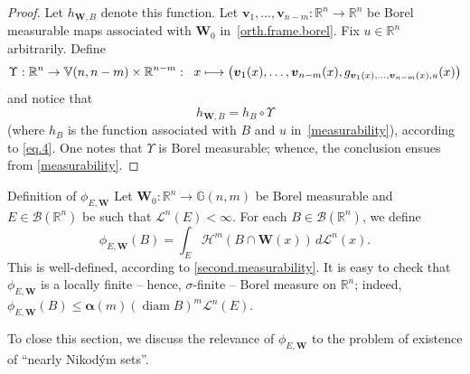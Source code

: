 \documentclass[JEP,XML,SOM,Unicode,ThmDefs,NoEqCountersInSection]{cedram}
\newcommand\mto{\mathchoice{\longmapsto}{\mapsto}{\mapsto}{\mapsto}}
\newenvironment{Empty}[2][\null]{%
\begin{enonce}[remark]{#1}#2}
{\end{enonce}}
\newcommand{\R}{\mathbb{R}}
\newcommand{\Rn}{\R^n}
\newcommand{\calB}{\mathscr{B}}
\newcommand{\calH}{\mathscr{H}}
\newcommand{\calL}{\mathscr{L}}
\newcommand{\balpha}{\boldsymbol{\alpha}}
\newcommand{\bW}{{\boldsymbol{W}}}
\newcommand{\bv}{{\boldsymbol{v}}}
\newcommand{\bV}{\mathbb{V}}
\newcommand{\bG}{\mathbb{G}}
\DeclareMathOperator{\rmdiam}{\mathrm{diam}}
\begin{document}
\begin{proof}
Let $h_{\bW,B}$ denote this function.
Let $\bv_1,\ldots,\bv_{n-m}: \Rn \to \Rn$ be Borel measurable maps associated with $\bW_0$ in~\ref{orth.frame.borel}.
Fix $u \in \Rn$ arbitrarily.
Define
\begin{equation*}
\Upsilon: \Rn \to \bV(n,n-m) \times \R^{n-m}:\;\; x \mto \left(\bv_1(x),\ldots,\bv_{n-m}(x),g_{\bv_1(x),\ldots,\bv_{n-m}(x),u}(x) \right)
\end{equation*}
and notice that
\begin{equation*}
h_{\bW,B} = h_{B} \circ \Upsilon
\end{equation*}
(where $h_{B}$ is the function associated with $B$ and $u$ in~\ref{measurability}), according to \eqref{eq.4}.
One notes that $\Upsilon$ is Borel measurable; whence, the conclusion ensues from \ref{measurability}.
\end{proof}

\begin{Empty}[Definition of $\phi_{E,\bW}$]
\label{def.phi}
Let $\bW_0: \Rn \to \bG(n,m)$ be Borel measurable and $E \in \calB(\Rn)$ be such that $\calL^n(E) < \infty$.
For each $B \in \calB(\Rn)$, we define
\begin{equation*}
\phi_{E,\bW}(B) = \int_E \calH^m(B \cap \bW(x)) \,d\calL^n(x).
\end{equation*}
This is well-defined, according to \ref{second.measurability}.
It is easy to check that $\phi_{E,\bW}$ is a locally finite -- hence, $\sigma$-finite -- Borel measure on $\Rn$; indeed, $\phi_{E,\bW}(B) \leq \balpha(m) (\rmdiam B)^m \calL^n(E)$.
\par
To close this section, we discuss the relevance of $\phi_{E,\bW}$ to the problem of existence of ``nearly Nikod\'ym sets''.
\end{Empty}
\end{document}

